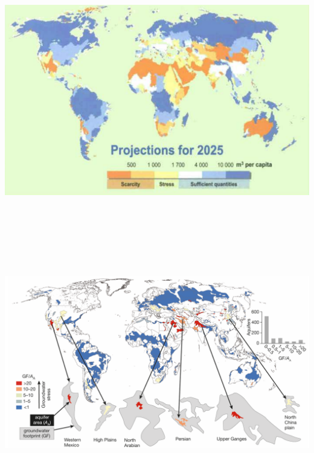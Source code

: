 \documentclass[]{article}
\begin{document}
\hypertarget{section-11}{%
\subsection{}\label{section-11}}

\includegraphics[width=\textwidth,height=4.16667in]{figures/m10_freshwater_per_capita.png}

\hypertarget{section-12}{%
\subsection{}\label{section-12}}

\includegraphics[width=\textwidth,height=4.16667in]{figures/m10_groundwater_availability.png}
\end{document}
